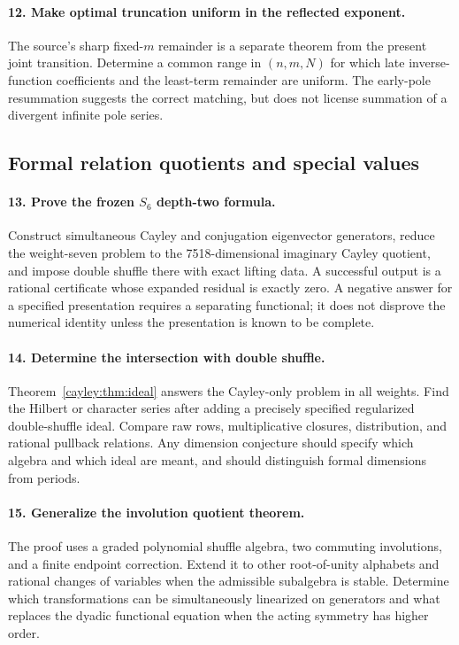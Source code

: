 \paragraph{12. Make optimal truncation uniform in the reflected exponent.}
The source's sharp fixed-$m$ remainder is a separate theorem from the
present joint transition. Determine a common range in $(n,m,N)$ for
which late inverse-function coefficients and the least-term remainder
are uniform. The early-pole resummation suggests the correct matching,
but does not license summation of a divergent infinite pole series.

\subsection{Formal relation quotients and special values}

\paragraph{13. Prove the frozen $S_6$ depth-two formula.}
Construct simultaneous Cayley and conjugation eigenvector generators,
reduce the weight-seven problem to the 7518-dimensional imaginary
Cayley quotient, and impose double shuffle there with exact lifting
data. A successful output is a rational certificate whose expanded
residual is exactly zero. A negative answer for a specified presentation
requires a separating functional; it does not disprove the numerical
identity unless the presentation is known to be complete.

\paragraph{14. Determine the intersection with double shuffle.}
Theorem~\ref{cayley:thm:ideal} answers the Cayley-only problem in all
weights. Find the Hilbert or character series after adding a precisely
specified regularized double-shuffle ideal. Compare raw rows,
multiplicative closures, distribution, and rational pullback relations.
Any dimension conjecture should specify which algebra and which ideal
are meant, and should distinguish formal dimensions from periods.

\paragraph{15. Generalize the involution quotient theorem.}
The proof uses a graded polynomial shuffle algebra, two commuting
involutions, and a finite endpoint correction. Extend it to other
root-of-unity alphabets and rational changes of variables when the
admissible subalgebra is stable. Determine which transformations can be
simultaneously linearized on generators and what replaces the dyadic
functional equation when the acting symmetry has higher order.

